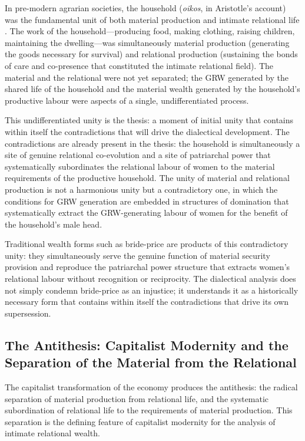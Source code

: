 In pre-modern agrarian societies, the household (\emph{oikos}, in Aristotle's account) was the fundamental unit of both material production and intimate relational life \parencite{aristotle2000}. The work of the household---producing food, making clothing, raising children, maintaining the dwelling---was simultaneously material production (generating the goods necessary for survival) and relational production (sustaining the bonds of care and co-presence that constituted the intimate relational field). The material and the relational were not yet separated; the GRW generated by the shared life of the household and the material wealth generated by the household's productive labour were aspects of a single, undifferentiated process.

This undifferentiated unity is the thesis: a moment of initial unity that contains within itself the contradictions that will drive the dialectical development. The contradictions are already present in the thesis: the household is simultaneously a site of genuine relational co-evolution and a site of patriarchal power that systematically subordinates the relational labour of women to the material requirements of the productive household. The unity of material and relational production is not a harmonious unity but a contradictory one, in which the conditions for GRW generation are embedded in structures of domination that systematically extract the GRW-generating labour of women for the benefit of the household's male head.

Traditional wealth forms such as bride-price are products of this contradictory unity: they simultaneously serve the genuine function of material security provision and reproduce the patriarchal power structure that extracts women's relational labour without recognition or reciprocity. The dialectical analysis does not simply condemn bride-price as an injustice; it understands it as a historically necessary form that contains within itself the contradictions that drive its own supersession.

\subsection{The Antithesis: Capitalist Modernity and the Separation of the Material from the Relational}
\label{p15:subsec:antithesis}

\noindent
The capitalist transformation of the economy produces the antithesis: the radical separation of material production from relational life, and the systematic subordination of relational life to the requirements of material production. This separation is the defining feature of capitalist modernity for the analysis of intimate relational wealth.

